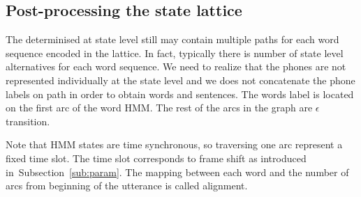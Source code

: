 % 
% 

\subsection{Post-processing the state lattice}
\label{sec:postprocess}
The  determinised at state level still may contain
multiple paths for each word sequence encoded in the lattice.
In fact, typically there is number of state level alternatives for each word sequence.
We need to realize that the phones are not represented individually at the state level
and we does not concatenate the phone labels on path in order to obtain words and sentences.
The words label is located on the first arc of the word \ac{HMM}. 
The rest of the arcs in the graph are $\epsilon$ transition.

Note that \ac{HMM} states are time synchronous, so traversing one arc represent a fixed time slot.
The time slot corresponds to frame shift as introduced in~Subsection~\ref{sub:param}.
The mapping between each word and the number of arcs from beginning of the utterance is called
alignment.

